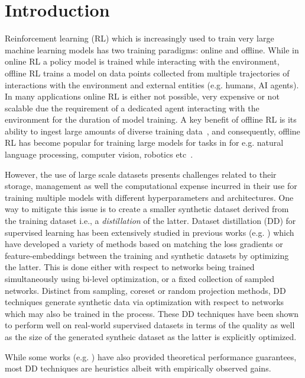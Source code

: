 \section{Introduction}

Reinforcement learning (RL) which is increasingly used to train very large machine learning models has two training paradigms: online and offline. While in online RL a policy model is trained while interacting with the environment, offline RL trains a model on data points collected from multiple trajectories of interactions with the environment and external entities (e.g. humans, AI agents). In many applications %
online RL is either not possible, very expensive or not scalable due the requirement of a dedicated agent interacting with the environment for the duration of model training. A key benefit of offline RL is its ability to ingest large amounts of diverse training data~\citep{fu2021d4rldatasetsdeepdatadriven}, and consequently, offline RL has become popular for training large models for tasks in for e.g. natural language processing, computer vision, robotics etc~\citep{levine2020offlinereinforcementlearningtutorial}. 


However, the use of large scale datasets presents challenges related to their storage, management as well the computational expense incurred in their use for training multiple models with different hyperparameters and architectures.  
One way to mitigate this issue is to create a smaller synthetic dataset derived from the training dataset i.e., a \emph{distillation} of the latter. Dataset distillation (DD) for supervised learning has been extensively studied in previous works (e.g. \cite{Wangetal18,sachdeva2023data,10273632}) which have developed a variety of methods based on matching the loss gradients or feature-embeddings between the training and synthetic datasets by optimizing the latter. This is done either with respect to networks being trained simultaneously using bi-level optimization, or a fixed collection of sampled networks. 
Distinct from sampling, coreset or random projection methods, DD techniques generate synthetic data via optimization with respect to networks which may also be trained in the process. These DD techniques have been shown to perform well on real-world supervised datasets in terms of the quality as well as the size of the generated syntheic dataset as the latter is explicitly optimized.  

While some works (e.g. \cite{nguyen2021dataset,chen2024provable}) have also provided theoretical performance guarantees, most DD techniques are heuristics albeit with empirically observed gains.  



